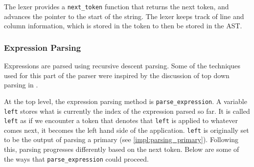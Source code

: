 The lexer provides a \verb|next_token| function that returns the next token, and advances the pointer to the start of the string. The lexer keeps track of line and column information, which is stored in the token to then be stored in the \ac{AST}. 

\subsubsection{Expression Parsing}
Expressions are parsed using recursive descent parsing. Some of the techniques used for this part of the parser were inspired by the discussion of top down parsing in \cite{dragon_book}. 

At the top level, the expression parsing method is \verb|parse_expression|. A variable \verb|left| stores what is currently the index of the expression parsed so far. It is called \verb|left| as if we encounter a token that denotes that \verb|left| is applied to whatever comes next, it becomes the left hand side of the application. \verb|left| is originally set to be the output of parsing a primary (see \ref{impl:parsing_primary}). Following this, parsing progresses differently based on the next token. Below are some of the ways that \verb|parse_expression| could proceed.
